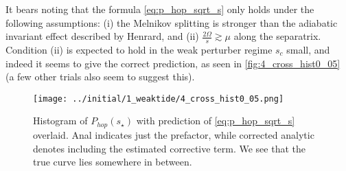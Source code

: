 \documentclass[11pt,
        usenames, %
        dvipsnames %
    ]{article}
\begin{document}
It bears noting that the formula \autoref{eq:p_hop_sqrt_s} only holds under the
following assumptions: (i) the Melnikov splitting is stronger than the adiabatic
invariant effect described by Henrard, and (ii) $\frac{2\Omega}{s} \gtrsim \mu$
along the separatrix. Condition (ii) is expected to hold in the weak perturber
regime $s_c$ small, and indeed it seems to give the correct prediction, as seen
in \autoref{fig:4_cross_hist0_05} (a few other trials also seem to suggest
this).
\begin{figure}[t]
    \centering
    \texttt{[image: ../initial/1\_weaktide/4\_cross\_hist0\_05.png]}
    \caption{Histogram of $P_{hop}(s_\star)$ with prediction of
    \autoref{eq:p_hop_sqrt_s} overlaid. Anal indicates just the prefactor, while
    corrected analytic denotes including the estimated corrective term. We see
    that the true curve lies somewhere in between.}\label{fig:4_cross_hist0_05}
\end{figure}
\end{document}
